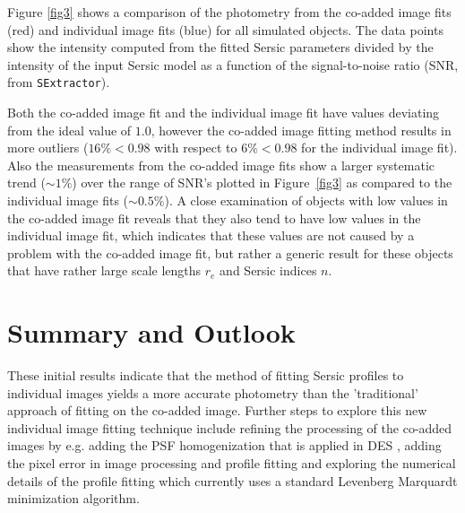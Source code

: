 Figure \ref{fig3} shows a comparison of the photometry from the co-added image fits (red) and individual image fits (blue) for all simulated objects. The data points show the intensity computed from the fitted Sersic parameters divided by the intensity of the input Sersic model as a function of the signal-to-noise ratio (SNR, from {\tt SExtractor}).

Both the co-added image fit and the individual image fit have values deviating from the ideal value of $1.0$, however the co-added image fitting method results in more outliers ($16\%< 0.98$ with respect to $6\% < 0.98$ for the individual image fit). Also the measurements from the co-added image fits show a larger systematic trend ($\sim1\%$) over the range of SNR's plotted in Figure~\ref{fig3} as compared to the individual image fits ($\sim0.5\%$). A close examination of objects with low values in the co-added image fit reveals that they also tend to have low values in the individual image fit, which indicates that these values are not caused by a problem with the co-added image fit, but rather a generic result for these objects that have rather large scale lengths $r_e$ and Sersic indices $n$.

\section{Summary and Outlook}
These initial results indicate that the method of fitting Sersic profiles to individual images yields a more accurate photometry than the 'traditional' approach of fitting on the co-added image. Further steps to explore this new individual image fitting technique include refining the processing of the co-added images by e.g. adding the PSF homogenization that is applied in DES \citep{2008SPIE.7016E..17M}, adding the pixel error in image processing and profile fitting and exploring the numerical details of the profile fitting which currently uses a standard Levenberg Marquardt minimization algorithm.


